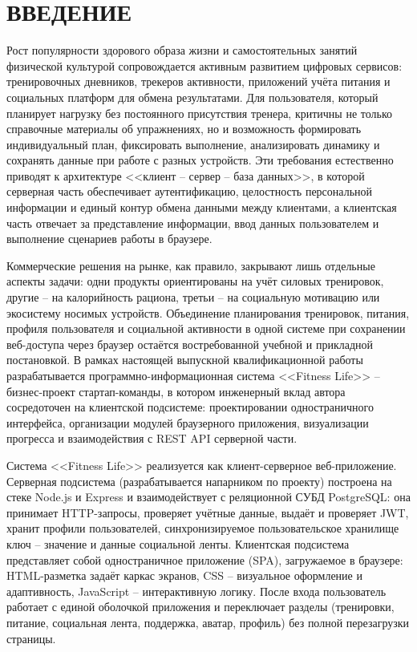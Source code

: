 \section*{ВВЕДЕНИЕ}

Рост популярности здорового образа жизни и самостоятельных занятий физической культурой сопровождается активным развитием цифровых сервисов: тренировочных дневников, трекеров активности, приложений учёта питания и социальных платформ для обмена результатами. Для пользователя, который планирует нагрузку без постоянного присутствия тренера, критичны не только справочные материалы об упражнениях, но и возможность формировать индивидуальный план, фиксировать выполнение, анализировать динамику и сохранять данные при работе с разных устройств. Эти требования естественно приводят к архитектуре <<клиент -- сервер -- база данных>>, в которой серверная часть обеспечивает аутентификацию, целостность персональной информации и единый контур обмена данными между клиентами, а клиентская часть отвечает за представление информации, ввод данных пользователем и выполнение сценариев работы в браузере.

Коммерческие решения на рынке, как правило, закрывают лишь отдельные аспекты задачи: одни продукты ориентированы на учёт силовых тренировок, другие -- на калорийность рациона, третьи -- на социальную мотивацию или экосистему носимых устройств. Объединение планирования тренировок, питания, профиля пользователя и социальной активности в одной системе при сохранении веб-доступа через браузер остаётся востребованной учебной и прикладной постановкой. В рамках настоящей выпускной квалификационной работы разрабатывается программно-информационная система <<Fitness Life>> -- бизнес-проект стартап-команды, в котором инженерный вклад автора сосредоточен на клиентской подсистеме: проектировании одностраничного интерфейса, организации модулей браузерного приложения, визуализации прогресса и взаимодействия с REST API серверной части.

Система <<Fitness Life>> реализуется как клиент-серверное веб-приложение. Серверная подсистема (разрабатывается напарником по проекту) построена на стеке Node.js и Express и взаимодействует с реляционной СУБД PostgreSQL: она принимает HTTP-запросы, проверяет учётные данные, выдаёт и проверяет JWT, хранит профили пользователей, синхронизируемое пользовательское хранилище ключ -- значение и данные социальной ленты. Клиентская подсистема представляет собой одностраничное приложение (SPA), загружаемое в браузере: HTML-разметка задаёт каркас экранов, CSS -- визуальное оформление и адаптивность, JavaScript -- интерактивную логику. После входа пользователь работает с единой оболочкой приложения и переключает разделы (тренировки, питание, социальная лента, поддержка, аватар, профиль) без полной перезагрузки страницы.

